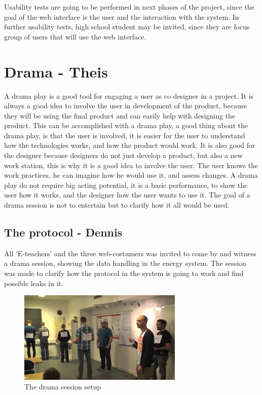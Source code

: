 Usability tests are going to be performed in next phases of the project, since the goal of the web interface is the user and the interaction with the system. In further usability tests, high school student may be invited, since they are focus group of users that will use the web interface.


\section{Drama - Theis}
A drama play is a good tool for engaging a user as co designer in a project. It is always a good idea to involve the user in development of the product, because they will be using the final product and can easily help with designing the product. This can be accomplished with a drama play, a good thing about the drama play, is that the user is involved, it is easier for the user to understand how the technologies works, and how the product would work. It is also good for the designer because designers do not just develop a product, but also a new work station, this is why it is a good idea to involve the user. The user knows the work practices, he can imagine how he would use it, and assess changes. A drama play do not require big acting potential, it is a basic performance, to show the user how it works, and the designer how the user wants to use it. The goal of a drama session is not to entertain but to clarify how it all would be used.

\subsection{The protocol - Dennis}
All 'E-teachers' and the three web-costumers was invited to come by and witness a drama session, showing the data handling in the energy system. The session was made to clarify how the protocol in the system is going to work and find possible leaks in it. 
\begin{figure}[H]
	\center
		\includegraphics[width=0.7\textwidth]{images/drama_setup.png}
   	\caption{The drama session setup}
   	\label{fig:drama_session_setup}
\end{figure}

